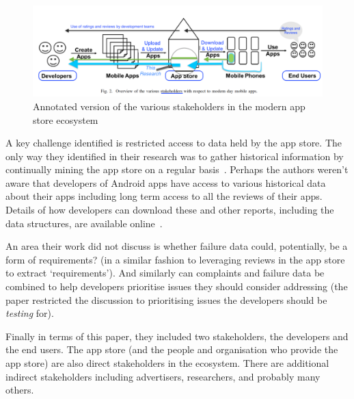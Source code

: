 \begin{figure}
    \centering
    \includegraphics[width=\linewidth]{images/related-work/future-trends-in-sweng-for-mobile-apps-fig-2-annotated-with-highlights.pdf}
    \caption[Various stakeholders in the modern app store ecosystem, adapted from~\cite{nagappan2016_future_trends_in_sw_eng_for_mobile_apps}]{Annotated version of the various stakeholders in the modern app store ecosystem~\cite{nagappan2016_future_trends_in_sw_eng_for_mobile_apps}}
    \label{fig:nagappan2016_future_trends_in_sw_eng_for_mobile_apps_figure_2_annotated}
\end{figure}
 

A key challenge identified is restricted access to data held by the app store. The only way they identified in their research was to gather historical information by continually mining the app store on a regular basis~. Perhaps the authors weren't aware that developers of Android apps have access to various historical data about their apps including long term access to all the reviews of their apps. Details of how developers can download these and other reports, including the data structures, are available online~.

An area their work did not discuss is whether failure data could, potentially, be a form of requirements? (in a similar fashion to leveraging reviews in the app store to extract `requirements'). And similarly can complaints and failure data be combined to help developers prioritise issues they should consider addressing (the paper restricted the discussion to prioritising issues the developers should be \emph{testing} for).

Finally in terms of this paper, they included two stakeholders, the developers and the end users. The app store (and the people and organisation who provide the app store) are also direct stakeholders in the ecosystem. There are additional indirect stakeholders including advertisers, researchers, and probably many others. 

